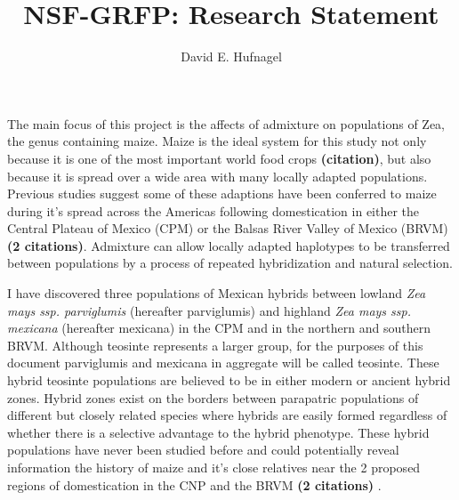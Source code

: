 \documentclass[12pt]{amsart}
\title{NSF-GRFP: Research Statement}
\author{David E. Hufnagel}
\begin{document}
\maketitle

The main focus of this project is the affects of admixture on populations of Zea, the genus containing maize.  
Maize is the ideal system for this study not only because it is one of the most important world food crops \textbf{(citation)}, but also because it is spread over a wide area with many locally adapted populations.  
Previous studies suggest some of these adaptions have been conferred to maize during it's spread across the Americas following domestication in either the Central Plateau of Mexico (CPM) or the Balsas River Valley of Mexico (BRVM) \textbf{(2 citations)}.  
Admixture can allow locally adapted haplotypes to be transferred between populations by a process of repeated hybridization and natural selection.


I have discovered three populations of Mexican hybrids between lowland \textit{Zea mays ssp. parviglumis} (hereafter parviglumis) and highland \textit{Zea mays ssp. mexicana} (hereafter mexicana) in the CPM and in the northern and southern BRVM.
Although teosinte represents a larger group, for the purposes of this document parviglumis and mexicana in aggregate will be called teosinte.
These hybrid teosinte populations are believed to be in either modern or ancient hybrid zones.  
Hybrid zones exist on the borders between parapatric populations of different but closely related species where hybrids are easily formed regardless of whether there is a selective advantage to the hybrid phenotype.
These hybrid populations have never been studied before and could potentially reveal information the history of maize and it's close relatives near the 2 proposed regions of domestication in the CNP and the BRVM \textbf{(2 citations)} .
\end{document}
